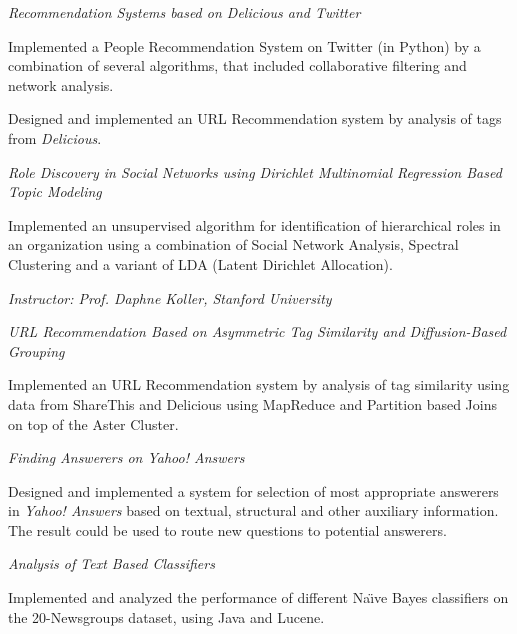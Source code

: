 \documentclass[10pt]{article}
\newcommand{\spc}{\vspace{1mm}}
\begin{document}
\textit{Recommendation Systems based on Delicious and Twitter} 
\begin{compactitem}
\item {Implemented a People Recommendation System on Twitter (in Python) by a combination of several algorithms, that included collaborative filtering and network analysis.}
\item{Designed and implemented an URL Recommendation system by analysis of tags from \emph{Delicious}.}
\end{compactitem}
\spc
\textit{Role Discovery in Social Networks using Dirichlet Multinomial Regression Based Topic Modeling} 
\begin{compactitem}
\item{Implemented an unsupervised algorithm for identification of hierarchical roles in an organization using a combination of Social Network Analysis, Spectral Clustering and a variant of LDA (Latent Dirichlet Allocation).}
\item \emph{Instructor: Prof. Daphne Koller, Stanford University}
\end{compactitem}
\spc
\textit{URL Recommendation Based on Asymmetric Tag Similarity and Diffusion-Based Grouping}
\begin{compactitem}
\item {Implemented an URL Recommendation system by analysis of tag similarity using data from ShareThis and Delicious using MapReduce and Partition based Joins on top of the Aster Cluster.}
\end{compactitem}
\spc

\textit{Finding Answerers on Yahoo! Answers}
\begin{compactitem}
\item {Designed and implemented a system for selection of most appropriate answerers in \emph{Yahoo! Answers} based on textual, structural and other auxiliary information. The result could be used to route new questions to potential answerers.}
\end{compactitem}
\spc

\textit{Analysis of Text Based Classifiers}
\begin{compactitem}
\item {Implemented and analyzed the performance of different Na\"{\i}ve Bayes classifiers on the 20-Newsgroups dataset, using Java and Lucene.}
\end{compactitem}
\spc
\end{document}
